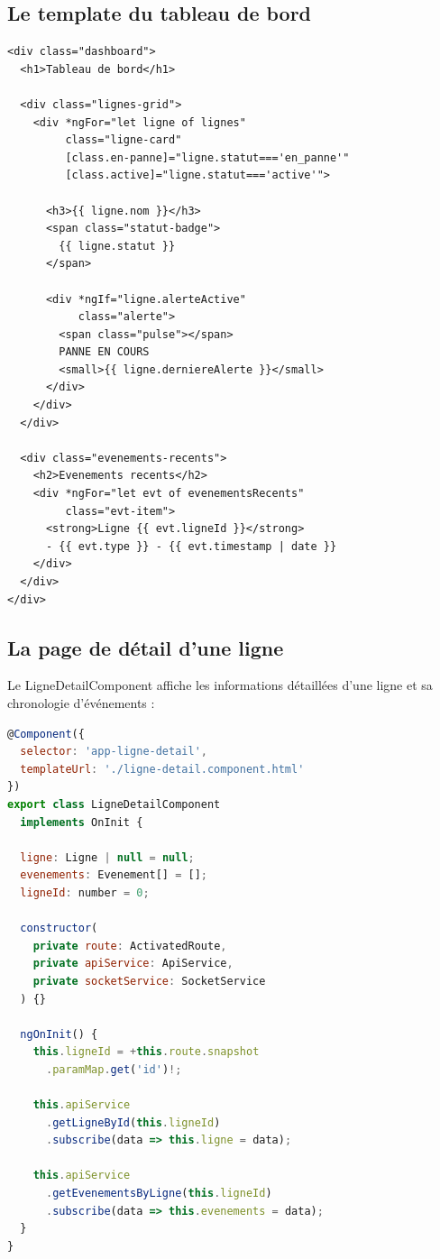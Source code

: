 \subsection{Le template du tableau de bord}

\begin{lstlisting}[caption={Template du Dashboard},
label={lst:dashboard_template}]
<div class="dashboard">
  <h1>Tableau de bord</h1>
  
  <div class="lignes-grid">
    <div *ngFor="let ligne of lignes" 
         class="ligne-card"
         [class.en-panne]="ligne.statut==='en_panne'"
         [class.active]="ligne.statut==='active'">
      
      <h3>{{ ligne.nom }}</h3>
      <span class="statut-badge">
        {{ ligne.statut }}
      </span>
      
      <div *ngIf="ligne.alerteActive" 
           class="alerte">
        <span class="pulse"></span>
        PANNE EN COURS
        <small>{{ ligne.derniereAlerte }}</small>
      </div>
    </div>
  </div>
  
  <div class="evenements-recents">
    <h2>Evenements recents</h2>
    <div *ngFor="let evt of evenementsRecents" 
         class="evt-item">
      <strong>Ligne {{ evt.ligneId }}</strong>
      - {{ evt.type }} - {{ evt.timestamp | date }}
    </div>
  </div>
</div>
\end{lstlisting}

\subsection{La page de d\'etail d'une ligne}

Le LigneDetailComponent affiche les informations d\'etaill\'ees d'une ligne et sa chronologie d'\'ev\'enements :

\begin{lstlisting}[language=JavaScript,
caption={Composant d\'etail de ligne},
label={lst:ligne_detail}]
@Component({
  selector: 'app-ligne-detail',
  templateUrl: './ligne-detail.component.html'
})
export class LigneDetailComponent 
  implements OnInit {
  
  ligne: Ligne | null = null;
  evenements: Evenement[] = [];
  ligneId: number = 0;

  constructor(
    private route: ActivatedRoute,
    private apiService: ApiService,
    private socketService: SocketService
  ) {}

  ngOnInit() {
    this.ligneId = +this.route.snapshot
      .paramMap.get('id')!;
    
    this.apiService
      .getLigneById(this.ligneId)
      .subscribe(data => this.ligne = data);
    
    this.apiService
      .getEvenementsByLigne(this.ligneId)
      .subscribe(data => this.evenements = data);
  }
}
\end{lstlisting}

